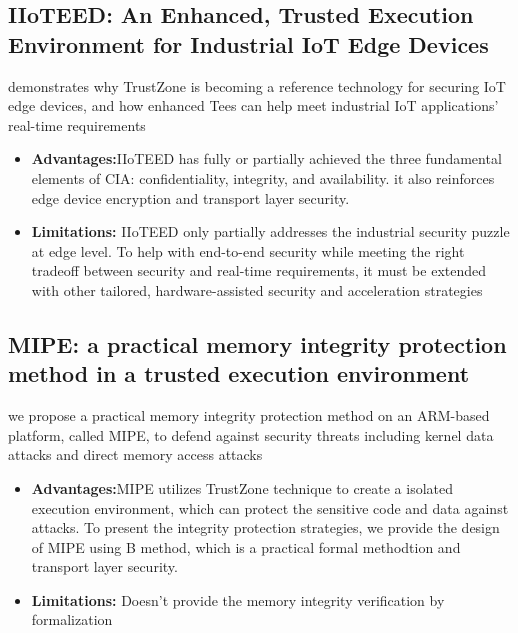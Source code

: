 \documentclass[conference]{IEEEtran}
\begin{document}
\subsection{IIoTEED: An Enhanced, Trusted Execution Environment for Industrial IoT Edge Devices}
demonstrates why TrustZone is becoming a reference technology for securing IoT edge devices, and how enhanced Tees can help meet industrial IoT applications’ real-time requirements
\begin{itemize}
    \item \textbf{Advantages:}IIoTEED has fully or partially achieved the three fundamental elements of CIA: confidentiality, integrity, and availability. it also reinforces edge device encryption and transport layer security.
    \item \textbf{Limitations:} IIoTEED only partially addresses the industrial security puzzle at edge level. To help with end-to-end security while meeting the right tradeoff between security and real-time requirements, it must be extended with other tailored, hardware-assisted security and acceleration strategies
\end{itemize}


\subsection{MIPE: a practical memory integrity protection method in a trusted execution environment}
we propose a practical memory integrity protection method on an ARM-based platform, called MIPE, to defend against security threats including kernel data attacks and direct memory access attacks
\begin{itemize}
    \item \textbf{Advantages:}MIPE utilizes TrustZone technique to create a isolated execution environment, which can protect the sensitive code and data against attacks. To present the integrity protection strategies, we provide the design of MIPE using B method, which is a practical formal methodtion and transport layer security.
    \item \textbf{Limitations:} Doesn't provide the memory integrity verification by formalization
\end{itemize}
\end{document}
